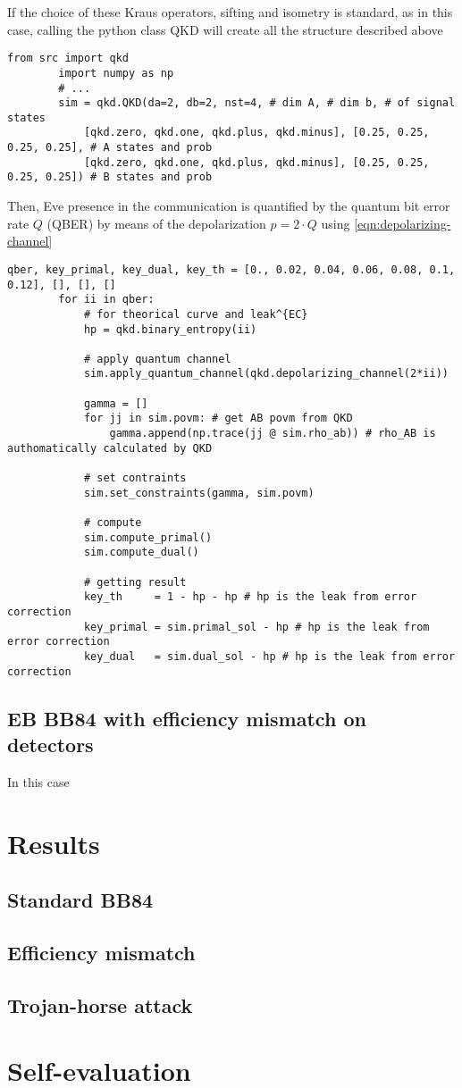 \documentclass{article}
\begin{document}
    If the choice of these Kraus operators, sifting and isometry is standard, as in this case, calling the python class \textrm{QKD} will create all the structure described above
    \begin{lstlisting}[style=python]
        from src import qkd
        import numpy as np
        # ...
        sim = qkd.QKD(da=2, db=2, nst=4, # dim A, # dim b, # of signal states
            [qkd.zero, qkd.one, qkd.plus, qkd.minus], [0.25, 0.25, 0.25, 0.25], # A states and prob
            [qkd.zero, qkd.one, qkd.plus, qkd.minus], [0.25, 0.25, 0.25, 0.25]) # B states and prob\end{lstlisting}
    Then, Eve presence in the communication is quantified by the quantum bit error rate \(Q\) (QBER) by means of the depolarization \(p=2\cdot Q\) using \eqref{eqn:depolarizing-channel}
    \begin{lstlisting}[style=python]
        qber, key_primal, key_dual, key_th = [0., 0.02, 0.04, 0.06, 0.08, 0.1, 0.12], [], [], []
        for ii in qber:
            # for theorical curve and leak^{EC}
            hp = qkd.binary_entropy(ii) 

            # apply quantum channel
            sim.apply_quantum_channel(qkd.depolarizing_channel(2*ii))

            gamma = []
            for jj in sim.povm: # get AB povm from QKD
                gamma.append(np.trace(jj @ sim.rho_ab)) # rho_AB is authomatically calculated by QKD

            # set contraints
            sim.set_constraints(gamma, sim.povm)

            # compute 
            sim.compute_primal()
            sim.compute_dual()

            # getting result
            key_th     = 1 - hp - hp # hp is the leak from error correction
            key_primal = sim.primal_sol - hp # hp is the leak from error correction
            key_dual   = sim.dual_sol - hp # hp is the leak from error correction \end{lstlisting}

    \subsection{EB BB84 with efficiency mismatch on detectors}
        In this case 



\section{Results}
 \subsection{Standard BB84}

 \subsection{Efficiency mismatch}

 \subsection{Trojan-horse attack}

\section{Self-evaluation}


\end{document}
